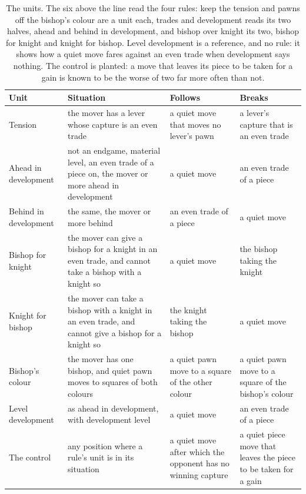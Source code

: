 \documentclass[11pt]{article}
\begin{document}
\begin{table}[ht]
\centering\footnotesize
\begin{tabularx}{\textwidth}{@{}lLLL@{}}
\toprule
Unit & Situation & Follows & Breaks \\
\midrule
Tension & the mover has a lever whose capture is an even trade & a quiet move that moves no lever's pawn & a lever's capture that is an even trade \\
Ahead in development & not an endgame, material level, an even trade of a piece on, the mover \LeadMin{} or more ahead in development & a quiet move & an even trade of a piece \\
Behind in development & the same, the mover \LeadMin{} or more behind & an even trade of a piece & a quiet move \\
Bishop for knight & the mover can give a bishop for a knight in an even trade, and cannot take a bishop with a knight so & a quiet move & the bishop taking the knight \\
Knight for bishop & the mover can take a bishop with a knight in an even trade, and cannot give a bishop for a knight so & the knight taking the bishop & a quiet move \\
Bishop's colour & the mover has one bishop, and quiet pawn moves to squares of both colours & a quiet pawn move to a square of the other colour & a quiet pawn move to a square of the bishop's colour \\
\midrule
Level development & as ahead in development, with development level & a quiet move & an even trade of a piece \\
The control & any position where a rule's unit is in its situation & a quiet move after which the opponent has no winning capture & a quiet piece move that leaves the piece to be taken for a gain \\
\bottomrule
\end{tabularx}
\caption{The units. The six above the line read the four rules: keep the tension and pawns off
the bishop's colour are a unit each, trades and development reads its two halves, ahead and behind
in development, and bishop over knight its two, bishop for knight and knight for bishop. Level
development is a reference, and no rule: it shows how a quiet move fares against an even trade when
development says nothing. The control is planted: a move that leaves its piece to be taken for a
gain is known to be the worse of two far more often than not.}
\label{tab:design}
\end{table}
\end{document}
